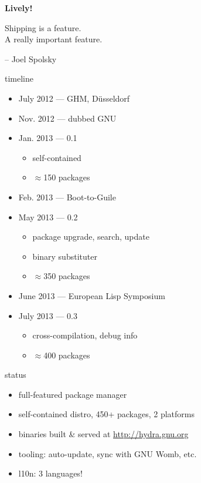 \documentclass{beamer}
\begin{document}
\begin{frame}[plain]
  \begin{centering}
    \Huge{\textbf{Lively!}}
  \end{centering}
\end{frame}

\begin{frame}[plain]
  \vspace{2cm}
  \textrm{\LARGE{%
      Shipping is a feature.\\
      A really important feature.
    }}
  
  \vspace{2cm}
  \hfill{-- Joel Spolsky}
\end{frame}

\begin{frame}{timeline}
  \begin{itemize}
    \item July 2012 --- GHM, Düsseldorf
    \item Nov. 2012 --- dubbed GNU
    \item{Jan. 2013 --- \alert{0.1}
      \begin{itemize}
        \item self-contained
        \item $\approx$150 packages
      \end{itemize}}
    \item{Feb. 2013 --- Boot-to-Guile}
    \item{May 2013 --- \alert{0.2}
        \begin{itemize}
          \item package upgrade, search, update
          \item binary substituter
          \item $\approx$350 packages
        \end{itemize}}
    \item{June 2013 --- European Lisp Symposium}
    \item{July 2013 --- \alert{0.3}
      \begin{itemize}
      \item cross-compilation, debug info
      \item $\approx$400 packages
      \end{itemize}}
  \end{itemize}
\end{frame}

\begin{frame}{status}
  \begin{itemize}
    \item full-featured package manager
    \item self-contained distro, 450+ packages, 2 platforms
    \item binaries built \& served at \url{http://hydra.gnu.org}
    \item tooling: auto-update, sync with GNU Womb, etc.
    \item l10n: 3 languages!
  \end{itemize}
\end{frame}
\end{document}
